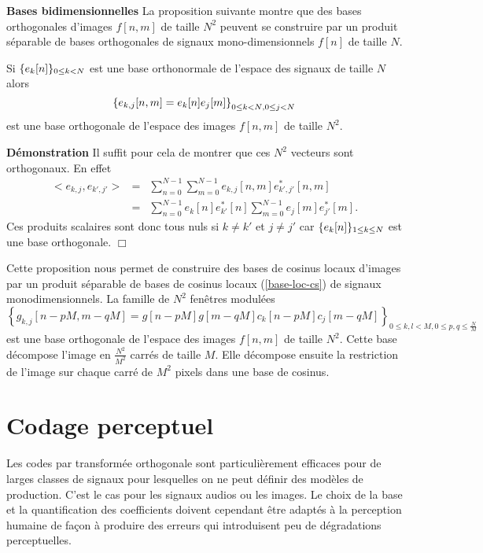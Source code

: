 {\bf Bases bidimensionnelles}
La proposition suivante montre que
des bases orthogonales d'images $f[n,m]$ de taille $N^2$ peuvent
se construire par un produit s\'eparable de bases orthogonales
de signaux mono-dimensionnels $f[n]$ de taille $N$.

\begin{proposition}
Si $\{e_k [n]\}_{ 0 \leq k < N}$ est une
base orthonormale de l'espace des signaux de taille $N$ alors 
\[
\left\{e_{k,j} [n,m] = e_k [n] e_j [m] \right\}_{{ 0 \leq k < N}, 0 \leq j < N}
\]
est une base orthogonale de l'espace
des images $f[n,m]$ de taille $N^2$.
\end{proposition}

{\bf D\'emonstration}
Il suffit pour cela de montrer que ces $N^2$ vecteurs sont
orthogonaux. En effet
\begin{eqnarray*}
<e_{k,j} , e_{k',j'}> &=& 
\sum_{n=0}^{N-1}\sum_{m=0}^{N-1}
e_{k,j}[n,m] e_{k',j'}^* [n,m] \\
&=&
\sum_{n=0}^{N-1}
e_{k}[n] e_{k'}^* [n] \sum_{m=0}^{N-1}
e_{j}[m] e_{j'}^* [m] .
\end{eqnarray*}
Ces produits scalaires sont donc tous nuls si $k \neq k'$
et $j \neq j'$ car $\{e_k [n]\}_{ 1 \leq k \leq N}$ est une base orthogonale.
$\Box$

Cette proposition nous permet de construire des 
bases
de cosinus locaux d'images par un produit s\'eparable de 
bases de cosinus locaux (\ref{base-loc-cs})
de signaux monodimensionnels.
La famille de $N^2$ fen\^etres modul\'ees
\begin{equation}
\left\{ g_{k,j} [n-pM,m-qM] = 
g[n-pM] g[m-qM] c_k [n-pM] c_j [m-qM]
\right\}_{0 \leq k,l < M, 0 \leq p,q \leq \frac N M}
\end{equation}
est une base orthogonale de l'espace des images $f[n,m]$ de
taille $N^2$.
Cette base d\'ecompose l'image en $\frac {N^2} {M^2}$ carr\'es
de taille $M$. Elle d\'ecompose ensuite
la restriction de l'image
sur chaque carr\'e de $M^2$ pixels dans une base de cosinus.

\section{Codage perceptuel}
\label{percept-code}

Les codes par transform\'ee orthogonale sont particuli\`erement
efficaces pour de larges classes de signaux pour lesquelles on ne
peut d\'efinir des mod\`eles de production.
C'est le cas pour les signaux audios ou les images.
Le choix de la base et la quantification des coefficients 
doivent cependant \^etre adapt\'es \`a la perception humaine de
fa\c con \`a produire des erreurs qui introduisent peu de d\'egradations
perceptuelles.

